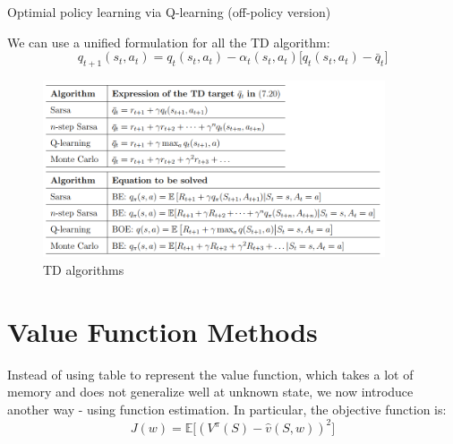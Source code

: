 \documentclass[10pt]{elegantbook}
\begin{document}
\begin{algorithm}[H]
\caption{Optimial policy learning via Q-learning (off-policy version)}

\end{algorithm}

\vspace{\baselineskip}

We can use a unified formulation for all the TD algorithm:
\[
    q_{t+1}(s_t, a_t) = q_t(s_t, a_t) - \alpha_t(s_t, a_t) \big [ q_t(s_t, a_t) - \bar q_t \big ]
\]

\begin{figure}[htbp]
    \centering
    \includegraphics[width=0.90\textwidth]{image/td.png}
    \caption{TD algorithms}
    \label{fig:td}
\end{figure}


\section{Value Function Methods}
Instead of using table to represent the value function, which takes a lot of memory and does not generalize well at unknown state, we now introduce another way - 
using function estimation. In particular, the objective function is:
\begin{equation} \label{eq:obj_value_func}
    J(w) = \mathbb E \big [ (V^{\pi}(S) - \hat v(S, w))^2 \big ]
\end{equation}
\end{document}
